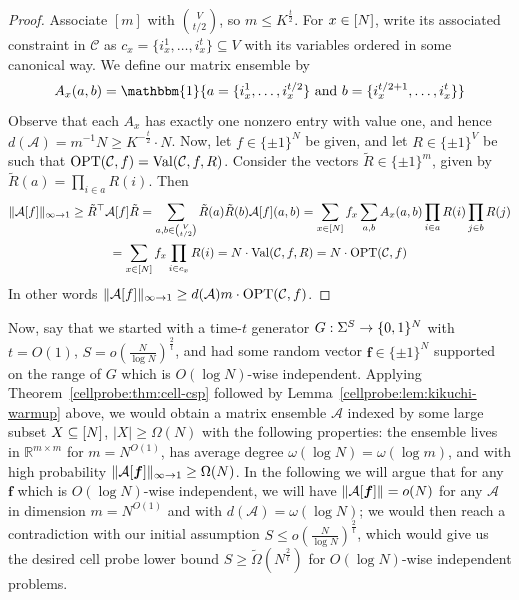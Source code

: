 \begin{proof}
Associate $[m]$ with $\binom{V}{t/2}$, so $m \leq K^{\frac{t}{2}}$. For $x \in[N]$, write its associated constraint in $\mathcal{C}$ as $c_x = \{i_x^1,\ldots,i^t_x \} \subseteq V$ with its variables ordered in some canonical way. We define our matrix ensemble by 
\[
A_x(a,b) = \mathbbm{1}\{ a = \{i_x^1,\ldots,i_x^{t/2}\} \text{ and } b = \{i_x^{t/2+1},\ldots,i_x^{t}\}\}
\]
Observe that each $A_x$ has exactly one nonzero entry with value one, and hence $d(\mathcal{A}) = m^{-1}N \geq  K^{-\frac{t}{2}} \cdot N$. Now, let $f\in \{\pm 1\}^N$ be given, and let $R\in \{\pm 1\}^V$ be such that $\mathrm{OPT}(\mathcal{C},f) = \mathrm{Val}(\mathcal{C},f,R)$. Consider the vectors $\tilde{R} \in \{\pm 1\}^m$, given by $\tilde{R}(a) = \prod_{i \in a} R(i)$. Then
\begin{gather*}
\Vert \mathcal{A}[f] \Vert_{\infty\to1} \geq \tilde{R}^\top \mathcal{A}[f] \tilde{R} = \sum_{a,b \in \binom{V}{t/2}} \tilde{R}(a) \tilde{R}(b) \mathcal{A}[f](a,b) = 
\sum_{x\in [N]} f_x\sum_{a,b} A_x(a,b) \prod_{i\in a} R(i) \prod_{j \in b} R(j)\\
= \sum_{x\in [N]} f_x\prod_{i \in c_x} R(i) = N \cdot \mathrm{Val}(\mathcal{C},f,R) = N \cdot \mathrm{OPT}(\mathcal{C},f)
\end{gather*}
In other words $\Vert \mathcal{A}[f] \Vert_{\infty\to1} \geq d(\mathcal{A})m \cdot \mathrm{OPT}(\mathcal{C},f)$.
\end{proof}

Now, say that we started with a time-$t$ generator $G: \Sigma^S \to \{0,1\}^N$ with $t=O(1)$, $S = o(\frac{N}{\log N})^{\frac{2}{t}}$, and had some random vector $\bm{f} \in \{\pm 1\}^N$ supported on the range of $G$ which is $O(\log N)$-wise independent. Applying Theorem~\ref{cellprobe:thm:cell-csp} followed by Lemma~\ref{cellprobe:lem:kikuchi-warmup} above, we would obtain a matrix ensemble $\mathcal{A}$ indexed by some large subset $X \subseteq [N]$, $|X| \geq \Omega(N)$ with the following properties: the ensemble lives in $\mathbb{R}^{m \times m}$ for $m= N^{O(1)}$, has average degree $\omega(\log N) = \omega(\log m)$, and with high probability $\Vert \mathcal{A}[\bm{f}] \Vert_{\infty\to 1} \geq \Omega(N)$. In the following we will argue that for any $\bm{f}$ which is $O(\log N)$-wise independent, we will have  $\Vert \mathcal{A}[\bm{f}] \Vert = o(N)$ for any $\mathcal{A}$ in dimension $m = N^{O(1)}$ and with $d(\mathcal{A}) = \omega(\log N)$; we would then reach a contradiction with our initial assumption $S \leq o(\frac{N}{\log N})^{\frac{2}{t}}$,
which would give us the desired cell probe lower bound $S \geq \tilde{\Omega}(N^{\frac{2}{t}})$ for $O(\log N)$-wise independent problems. 

